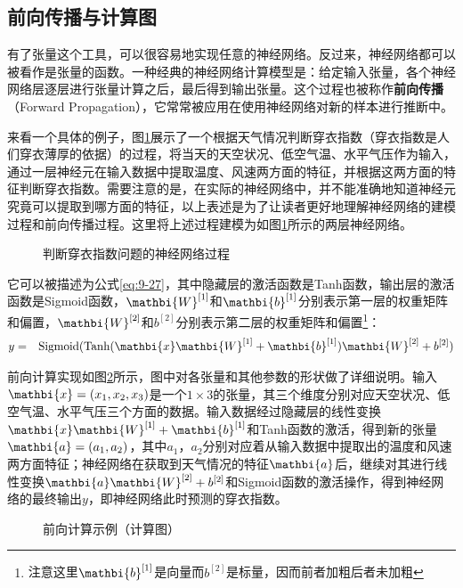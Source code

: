 
\subsection{前向传播与计算图}

\parinterval 有了张量这个工具，可以很容易地实现任意的神经网络。反过来，神经网络都可以被看作是张量的函数。一种经典的神经网络计算模型是：给定输入张量，各个神经网络层逐层进行张量计算之后，最后得到输出张量。这个过程也被称作{\small\sffamily\bfseries{前向传播}}（Forward Propagation），它常常被应用在使用神经网络对新的样本进行推断中。

\parinterval 来看一个具体的例子，图\ref{fig:9-37}展示了一个根据天气情况判断穿衣指数（穿衣指数是人们穿衣薄厚的依据）的过程，将当天的天空状况、低空气温、水平气压作为输入，通过一层神经元在输入数据中提取温度、风速两方面的特征，并根据这两方面的特征判断穿衣指数。需要注意的是，在实际的神经网络中，并不能准确地知道神经元究竟可以提取到哪方面的特征，以上表述是为了让读者更好地理解神经网络的建模过程和前向传播过程。这里将上述过程建模为如图\ref{fig:9-37}所示的两层神经网络。

\begin{figure}[htp]
\centering

\caption{判断穿衣指数问题的神经网络过程}
\label{fig:9-37}
\end{figure}

\parinterval 它可以被描述为公式\eqref{eq:9-27}，其中隐藏层的激活函数是Tanh函数，输出层的激活函数是Sigmoid函数，${\mathbi{W}}^{[1]}$和${\mathbi{b}}^{[1]}$分别表示第一层的权重矩阵和偏置，${\mathbi{W}}^{[2]}$和$b^{[2]}$分别表示第二层的权重矩阵和偏置\footnote{注意这里${\mathbi{b}}^{[1]}$是向量而$b^{[2]}$是标量，因而前者加粗后者未加粗}：
\begin{eqnarray}
y&=&{\textrm{Sigmoid}}({\textrm{Tanh}}({\mathbi{x}}{\mathbi{W}}^{[1]}+{\mathbi{b}}^{[1]}){\mathbi{W}}^{[2]}+ b^{[2]} )
\label{eq:9-27}
\end{eqnarray}

\parinterval 前向计算实现如图\ref{fig:9-38}所示，图中对各张量和其他参数的形状做了详细说明。输入$ {\mathbi{x}}=(x_1,x_2,x_3) $是一个$1\times 3$的张量，其三个维度分别对应天空状况、低空气温、水平气压三个方面的数据。输入数据经过隐藏层的线性变换$ {\mathbi{x}} {\mathbi{W}}^{[1]}+{\mathbi{b}}^{[1]}$和Tanh函数的激活，得到新的张量$ {\mathbi{a}}=(a_1,a_2) $，其中$a_1$，$a_2$分别对应着从输入数据中提取出的温度和风速两方面特征；神经网络在获取到天气情况的特征$ {\mathbi{a}}$后，继续对其进行线性变换${\mathbi{a}} {\mathbi{W}}^{[2]}+ b^{[2]} $和Sigmoid函数的激活操作，得到神经网络的最终输出$ y $，即神经网络此时预测的穿衣指数。
\begin{figure}[htp]
\centering

\caption{前向计算示例（计算图）}
\label{fig:9-38}
\end{figure}

